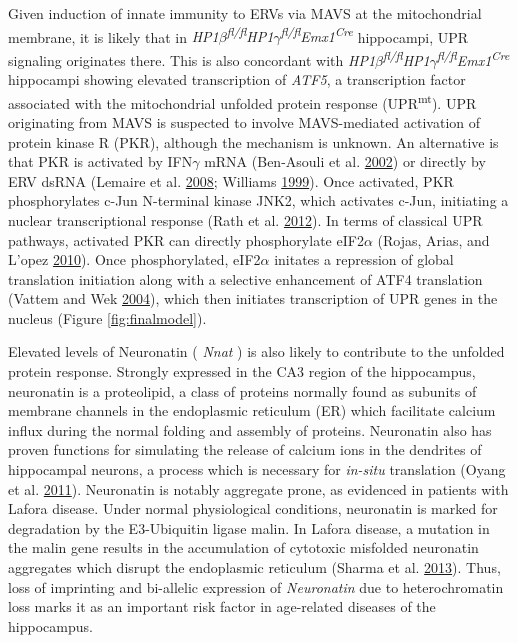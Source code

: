\documentclass[onehalf,12pt]{beavtex}
\begin{document}
  Given induction of innate immunity to ERVs via MAVS at the mitochondrial
  membrane, it is likely that in
  \emph{HP1\(\beta\)\textsuperscript{fl/fl}HP1\(\gamma\)\textsuperscript{fl/fl}Emx1\textsuperscript{Cre}}
  hippocampi, UPR signaling originates there. This is also concordant with
  \emph{HP1\(\beta\)\textsuperscript{fl/fl}HP1\(\gamma\)\textsuperscript{fl/fl}Emx1\textsuperscript{Cre}}
  hippocampi showing elevated transcription of \emph{ATF5}, a
  transcription factor associated with the mitochondrial unfolded protein
  response (UPR\textsuperscript{mt}). UPR originating from MAVS is
  suspected to involve MAVS-mediated activation of protein kinase R (PKR),
  although the mechanism is unknown. An alternative is that PKR is
  activated by IFN\(\gamma\) mRNA (Ben-Asouli et al.
  \protect\hyperlink{ref-Ben-AsouliHumaninterferongmRNA2002}{2002}) or
  directly by ERV dsRNA (Lemaire et al.
  \protect\hyperlink{ref-LemaireMechanismPKRActivation2008}{2008};
  Williams \protect\hyperlink{ref-WilliamsPKRsentinelkinase1999}{1999}).
  Once activated, PKR phosphorylates c-Jun N-terminal kinase JNK2, which
  activates c-Jun, initiating a nuclear transcriptional response (Rath et
  al.
  \protect\hyperlink{ref-RathInductiondsRNAactivatedprotein2012}{2012}).
  In terms of classical UPR pathways, activated PKR can directly
  phosphorylate eIF2\(\alpha\) (Rojas, Arias, and L\a'opez
  \protect\hyperlink{ref-RojasProteinKinaseResponsible2010}{2010}). Once
  phosphorylated, eIF2\(\alpha\) initates a repression of global
  translation initiation along with a selective enhancement of ATF4
  translation (Vattem and Wek
  \protect\hyperlink{ref-VattemReinitiationinvolvingupstream2004}{2004}),
  which then initiates transcription of UPR genes in the nucleus (Figure
  \ref{fig:finalmodel}).
  
  Elevated levels of Neuronatin ( \emph{Nnat} ) is also likely to
  contribute to the unfolded protein response. Strongly expressed in the
  CA3 region of the hippocampus, neuronatin is a proteolipid, a class of
  proteins normally found as subunits of membrane channels in the
  endoplasmic reticulum (ER) which facilitate calcium influx during the
  normal folding and assembly of proteins. Neuronatin also has proven
  functions for simulating the release of calcium ions in the dendrites of
  hippocampal neurons, a process which is necessary for \emph{in-situ}
  translation (Oyang et al.
  \protect\hyperlink{ref-OyangFunctionalCharacterizationDendritically2011}{2011}).
  Neuronatin is notably aggregate prone, as evidenced in patients with
  Lafora disease. Under normal physiological conditions, neuronatin is
  marked for degradation by the E3-Ubiquitin ligase malin. In Lafora
  disease, a mutation in the malin gene results in the accumulation of
  cytotoxic misfolded neuronatin aggregates which disrupt the endoplasmic
  reticulum (Sharma et al.
  \protect\hyperlink{ref-SharmaNeuronatinmediatedaberrantcalcium2013}{2013}).
  Thus, loss of imprinting and bi-allelic expression of \emph{Neuronatin}
  due to heterochromatin loss marks it as an important risk factor in
  age-related diseases of the hippocampus.
  
\end{document}
